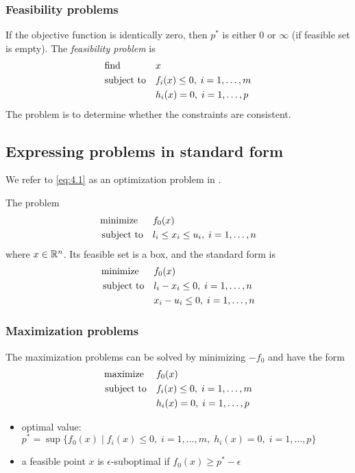 \subsubsection{Feasibility problems}
If the objective function is identically zero, then $p^\ast$ is either $0$ or $\infty$ (if feasible set is empty). The \textit{feasibility problem} is
\begin{align*}
  \text{find\;\;\;\;\;\;}\quad\quad& x\\
  \text{subject to}      \quad& f_i(x)\le 0,\;i=1,\dots,m\\
                              & h_i(x) =  0,\;i=1,\dots,p\\
\end{align*}
The problem is to determine whether the constraints are consistent.

\subsection{Expressing problems in standard form}
We refer to \eqref{eq:4.1} as an optimization problem in .
\begin{example}
  The problem
  \begin{align*}
    \text{minimize\;\;}\quad& f_0(x)\\
    \text{subject to}  \quad& l_i\le x_i\le u_i,\;i=1,\dots,n
  \end{align*}
  where $x\in\mathbb{R}^n$. Its feasible set is a box, and the standard form is
  \begin{align*}
    \text{minimize\;\;}\quad& f_0(x)\\
    \text{subject to}  \quad& l_i-x_i\le 0,\;i=1,\dots,n\\
                            & x_i-u_i\le 0,\;i=1,\dots,n
  \end{align*}
\end{example}
\subsubsection{Maximization problems}
The maximization problems can be solved by minimizing $-f_0$ and have the form
\begin{align}
  \text{maximize\;}\quad& f_0(x)\nonumber\\
  \text{subject to}  \quad& f_i(x)\le 0,\;i=1,\dots,m\label{eq:4.2}\\
                          & h_i(x) =  0,\;i=1,\dots,p\nonumber
\end{align}
\begin{itemize}
  \item optimal value: $p^\ast=\sup\{f_0(x)\mid f_i(x)\le 0,\;i=1,\dots,m,\;h_i(x)=0,\;i=1,\dots,p\}$
  \item a feasible point $x$ is $\epsilon$-suboptimal if $f_0(x)\ge p^\ast-\epsilon$
\end{itemize}

